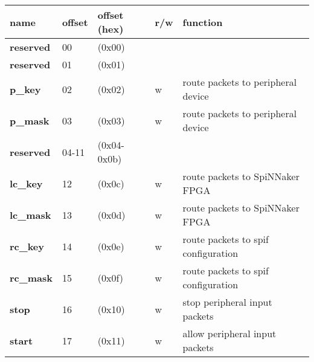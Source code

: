 \documentclass[11pt,a4paper,twoside]{article}
\begin{document}
\begin{center}
	\begin{tabularx}{\textwidth}{| p{34mm} p{13mm} p{21mm} p{7mm} X |}
		\hline
		\textbf{name} & \textbf{offset} & \textbf{offset} (hex) & \textbf{r/w} & \textbf{function} \\%
		\hline
		\hline
		\cellcolor{gray!25}\textbf{reserved} & \cellcolor{gray!25}00    & \cellcolor{gray!25}(0x00)       & \cellcolor{gray!25} & \cellcolor{gray!25}\\%
		\cellcolor{gray!25}\textbf{reserved} & \cellcolor{gray!25}01    & \cellcolor{gray!25}(0x01)       & \cellcolor{gray!25} & \cellcolor{gray!25}\\%
		\textbf{p\_key}                      & 02                       & (0x02)                          & w                   & route packets to peripheral device             \\%
		\textbf{p\_mask}                     & 03                       & (0x03)                          & w                   & route packets to peripheral device             \\%
		\cellcolor{gray!25}\textbf{reserved} & \cellcolor{gray!25}04-11 & \cellcolor{gray!25} (0x04-0x0b) & \cellcolor{gray!25} & \cellcolor{gray!25}\\%
		\textbf{lc\_key}                     & 12                       & (0x0c)                          & w                   & route packets to SpiNNaker FPGA  \\%
		\textbf{lc\_mask}                    & 13                       & (0x0d)                          & w                   & route packets to SpiNNaker FPGA  \\%
		\textbf{rc\_key}                     & 14                       & (0x0e)                          & w                   & route packets to spif configuration   \\%
		\textbf{rc\_mask}                    & 15                       & (0x0f)                          & w                   & route packets to spif configuration   \\%
		\textbf{stop}                        & 16                       & (0x10)                          & w                   & stop peripheral input packets         \\%
		\textbf{start}                       & 17                       & (0x11)                          & w                   & allow peripheral input packets         \\%
		\hline
	\end{tabularx}
\end{center}
\end{document}
